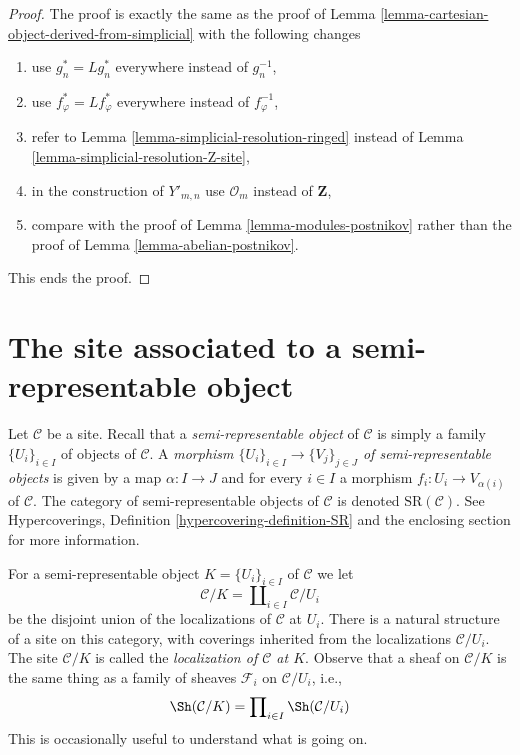 \begin{proof}
The proof is exactly the same as the proof of
Lemma \ref{lemma-cartesian-object-derived-from-simplicial}
with the following changes
\begin{enumerate}
\item use $g_n^* = Lg_n^*$ everywhere instead of $g_n^{-1}$,
\item use $f_\varphi^* = Lf_\varphi^*$ everywhere instead of $f_\varphi^{-1}$,
\item refer to Lemma \ref{lemma-simplicial-resolution-ringed}
instead of Lemma \ref{lemma-simplicial-resolution-Z-site},
\item in the construction of $Y'_{m, n}$ use
$\mathcal{O}_m$ instead of $\mathbf{Z}$,
\item compare with the proof of Lemma \ref{lemma-modules-postnikov}
rather than the proof of Lemma \ref{lemma-abelian-postnikov}.
\end{enumerate}
This ends the proof.
\end{proof}







\section{The site associated to a semi-representable object}
\label{section-semi-representable}

\noindent
Let $\mathcal{C}$ be a site. Recall that a {\it semi-representable object}
of $\mathcal{C}$ is simply a family $\{U_i\}_{i \in I}$
of objects of $\mathcal{C}$. A
{\it morphism $\{U_i\}_{i \in I} \to \{V_j\}_{j \in J}$ of
semi-representable objects} is given by a map $\alpha : I \to J$
and for every $i \in I$ a morphism $f_i : U_i \to V_{\alpha(i)}$
of $\mathcal{C}$.
The category of semi-representable objects of $\mathcal{C}$
is denoted $\text{SR}(\mathcal{C})$.
See Hypercoverings, Definition \ref{hypercovering-definition-SR}
and the enclosing section for more information.

\medskip\noindent
For a semi-representable object $K = \{U_i\}_{i \in I}$ of $\mathcal{C}$
we let
$$
\mathcal{C}/K = \coprod\nolimits_{i \in I} \mathcal{C}/U_i
$$
be the disjoint union of the localizations of $\mathcal{C}$ at $U_i$.
There is a natural structure of a site on this category, with
coverings inherited from the localizations $\mathcal{C}/U_i$.
The site $\mathcal{C}/K$ is called the
{\it localization of $\mathcal{C}$ at $K$}.
Observe that a sheaf on $\mathcal{C}/K$ is the same thing as
a family of sheaves $\mathcal{F}_i$ on $\mathcal{C}/U_i$, i.e.,
$$
\Sh(\mathcal{C}/K) = \prod\nolimits_{i \in I} \Sh(\mathcal{C}/U_i)
$$
This is occasionally useful to understand what is going on.


